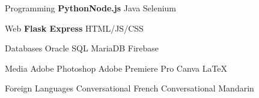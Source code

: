 

\begin{cvskills}

  \cvskill
  {Programming} %
  {\textbf{Python{\enskip\cdotp\enskip}Node.js} {\enskip\cdotp\enskip} Java {\enskip\cdotp\enskip} Selenium} %

  \cvskill
  {Web} %
  {\textbf{Flask {\enskip\cdotp\enskip} Express} {\enskip\cdotp\enskip} HTML/JS/CSS} %

  \cvskill
  {Databases} %
  {Oracle SQL {\enskip\cdotp\enskip} MariaDB {\enskip\cdotp\enskip} Firebase} %


  \cvskill
  {Media} %
  {Adobe Photoshop {\enskip\cdotp\enskip} Adobe Premiere Pro {\enskip\cdotp\enskip} Canva {\enskip\cdotp\enskip} \LaTeX} %


  \cvskill
  {Foreign Languages} %
  {Conversational French {\enskip\cdotp\enskip} Conversational Mandarin} %

\end{cvskills}

